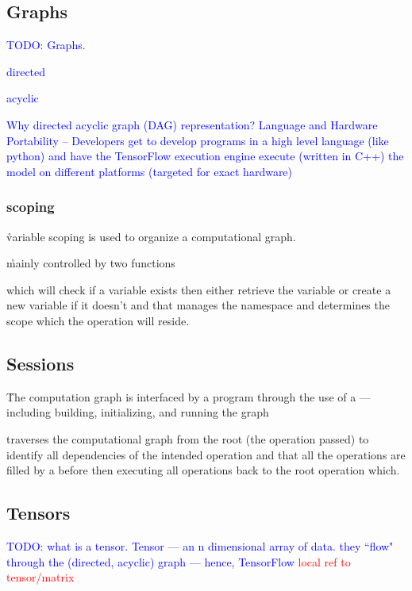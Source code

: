\subsection{Graphs}

\textcolor{blue}{TODO: Graphs.}

\textcolor{blue}{directed}

\textcolor{blue}{acyclic}

\textcolor{blue}{Why directed acyclic graph (DAG) representation? Language and Hardware Portability -- Developers get to develop programs in a high level language (like python) and have the TensorFlow execution engine execute (written in C++) the model on different platforms (targeted for exact hardware)}


\subsubsection{scoping}

\r{variable scoping is used to organize a computational graph. }

\r{mainly controlled by two functions}

\r{ which will check if a variable exists then either retrieve the variable or create a new variable if it doesn't and  that manages the namespace and determines the scope which the operation will reside.}

\subsection{Sessions}

\r{The computation graph is interfaced by a program through the use of a  --- including building, initializing, and running the graph}

\r{ traverses the computational graph from the root (the operation passed) to identify all dependencies of the intended operation and that all the  operations are filled by a  before then executing all operations back to the root operation which.}

\subsection{Tensors}

\textcolor{blue}{TODO: what is a tensor. Tensor --- an n dimensional array of data. they ``flow" through the (directed, acyclic) graph --- hence, TensorFlow \textcolor{red}{local ref to tensor/matrix}}

